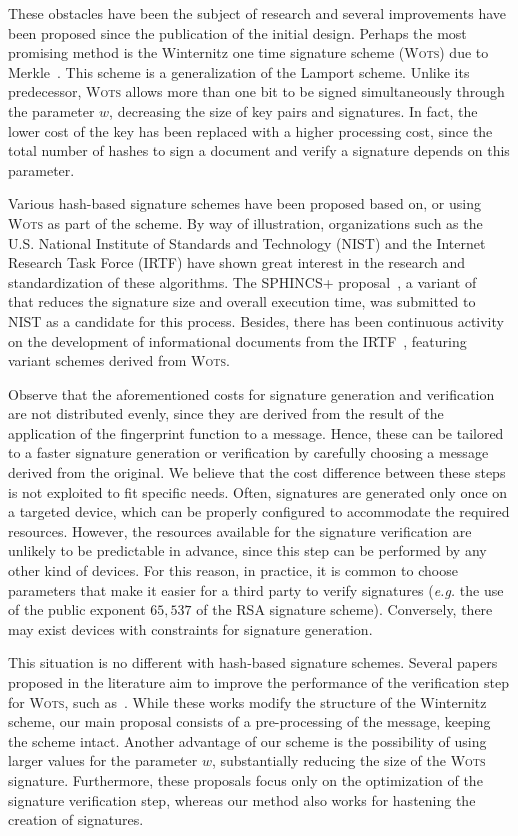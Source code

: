 \documentclass[12pt]{article}
\newcommand{\wots}{\textsc{Wots}}
\begin{document}
These obstacles have been the subject of research and several improvements have
been proposed since the publication of the initial design. Perhaps the most
promising method is the Winternitz one time signature scheme (\wots{})
due to Merkle~\cite{Merkle:inproc:1989:aug}. This scheme is a generalization of
the Lamport scheme. Unlike its predecessor, \wots{} allows more than one
bit to be signed simultaneously through the parameter $w$, decreasing the size
of key pairs and signatures. In fact, the lower cost of the key has been
replaced with a higher processing cost, since the total number of hashes to
sign a document and verify a signature depends on this parameter.

Various hash-based signature schemes have been proposed based on, or using
\wots{} as part of the scheme. By way of illustration, organizations such
as the U.S. National Institute of Standards and Technology (NIST) and the
Internet Research Task Force (IRTF) have shown great interest in the
research and standardization of these algorithms. The SPHINCS+
proposal~\cite{Bernstein:misc:2017:dec}, a variant
of~\cite{Bernstein:inproc:2015:apr} that reduces the signature size and overall
execution time, was submitted to NIST as a candidate for this process. Besides,
there has been continuous activity on the development of informational
documents from the IRTF~\cite{Huelsing:report:2018:may,McGrew:report:2018:apr},
featuring variant schemes derived from \wots{}.

Observe that the aforementioned costs for signature generation and verification
are not distributed evenly, since they are derived from the result of the
application of the fingerprint function to a message. Hence, these can be
tailored to a faster signature generation or verification by carefully choosing
a message derived from the original. We believe that the cost difference
between these steps is not exploited to fit specific needs. Often, signatures
are generated only once on a targeted device, which can be properly configured
to accommodate the required resources. However, the resources available for the
signature verification are unlikely to be predictable in advance, since this
step can be performed by any other kind of devices. For this reason, in
practice, it is common to choose parameters that make it easier for a third
party to verify signatures (\emph{e.g.} the use of the public exponent
$65{,}537$ of the RSA signature scheme). Conversely, there may exist devices
with constraints for signature generation.

This situation is no different with hash-based signature schemes. Several
papers proposed in the literature aim to improve the performance of the
verification step for \wots{}, such as~\cite{Cruz:inproc:2016:oct,
McGrew:report:2018:apr,Steinwandt:article:2008:oct}.
While these works modify the structure of the Winternitz scheme, our main
proposal consists of a pre-processing of the message, keeping the scheme
intact. Another advantage of our scheme is the possibility of using larger
values for the parameter $w$, substantially reducing the size of the
\wots{} signature. Furthermore, these proposals focus only on the
optimization of the signature verification step, whereas our method also works
for hastening the creation of signatures.
\end{document}
